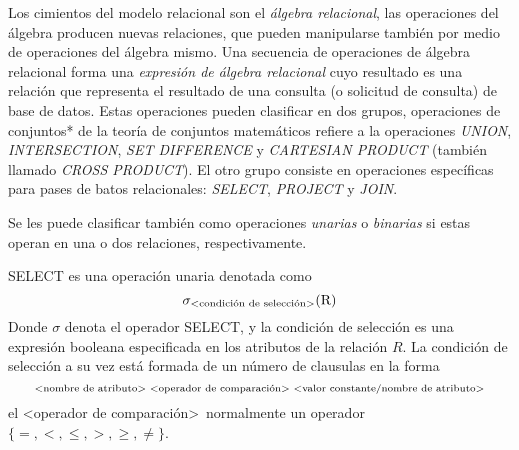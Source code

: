 Los cimientos del modelo relacional son el \emph{álgebra relacional}, las operaciones del álgebra producen nuevas relaciones, que pueden manipularse también por medio de operaciones del álgebra mismo. Una secuencia de operaciones de álgebra relacional forma una \emph{expresión de álgebra relacional} cuyo resultado es una relación que representa el resultado de una consulta (o solicitud de consulta) de base de datos. Estas operaciones pueden clasificar en dos grupos, operaciones de conjuntos* de la teoría de conjuntos matemáticos refiere a la operaciones \emph{UNION}, \emph{INTERSECTION}, \emph{SET DIFFERENCE} y \emph{CARTESIAN PRODUCT} (también llamado \emph{CROSS PRODUCT}). El otro grupo consiste en operaciones específicas para pases de batos relacionales: \emph{SELECT}, \emph{PROJECT} y \emph{JOIN}.

Se les puede clasificar también como operaciones \emph{unarias} o \emph{binarias} si estas operan en una o dos relaciones, respectivamente.

SELECT es una operación unaria denotada como
\begin{equation}
\sigma_\text{\textless condición de selección\textgreater}{\text{(R)}}
\end{equation}
Donde $\sigma$ denota el operador SELECT, y la condición de selección es una expresión booleana especificada en los atributos de la relación $R$. La condición de selección a su vez está formada de un número de clausulas en la forma
\begin{equation}
_\text{\textless nombre de atributo\textgreater\ \textless operador de comparación\textgreater\ \textless valor constante/nombre de atributo\textgreater}
\end{equation}
el \textless operador de comparación\textgreater\ normalmente un operador $\{=,<,\leq,>,\geq,\neq\}$.